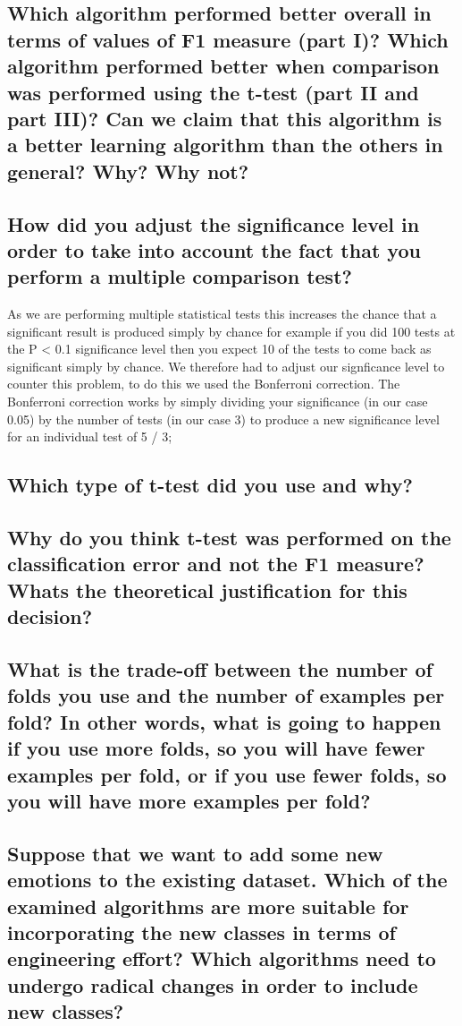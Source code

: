 \documentclass[11pt]{article}
\begin{document}
\subsection{Which algorithm performed better overall in terms of values of F1 measure (part I)? Which algorithm performed better when comparison was performed using the t-test (part II and part III)? Can we claim that this algorithm is a better learning algorithm than the others in general? Why? Why not?}

\subsection{How did you adjust the significance level in order to take into account the fact that you perform a multiple comparison test?}
As we are performing multiple statistical tests this increases the chance that a significant result is produced simply by chance for example if you did 100 tests at the P < 0.1 significance level then you expect 10 of the 
tests to come back as significant simply by chance. We therefore had to adjust our signficance level to counter this problem, to do this we used the Bonferroni correction. The Bonferroni correction works by simply dividing
your significance (in our case 0.05) by the number of tests (in our case 3) to produce a new significance level for an individual test of 5 / 3; 

\subsection{Which type of t-test did you use and why?}

\subsection{Why do you think t-test was performed on the classification error and not the F1 measure? Whats the theoretical justification for this decision?}

\subsection{What is the trade-off between the number of folds you use and the number of examples per fold? In other words, what is going to happen if you use more folds, so you will have fewer examples per fold, or if you use fewer folds, so you will have more examples per fold?}

\subsection{Suppose that we want to add some new emotions to the existing dataset. Which of the examined algorithms are more suitable for incorporating the new classes in terms of engineering effort? Which algorithms need to undergo radical changes in order to include new classes?}
\end{document}
